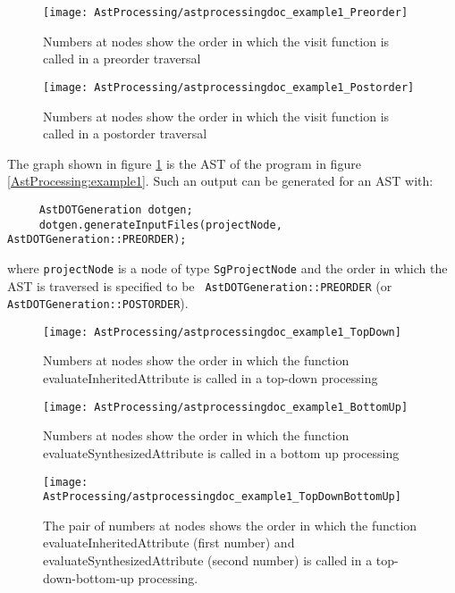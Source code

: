 \begin{figure}
\texttt{[image: AstProcessing/astprocessingdoc\_example1\_Preorder]}
\caption{Numbers at nodes show the order in which the visit function is called in a preorder traversal}
\label{AstProcessing:PreorderAst}
\end{figure}

\begin{figure}
\texttt{[image: AstProcessing/astprocessingdoc\_example1\_Postorder]}
\caption{Numbers at nodes show the order in which the visit function is called in a postorder traversal}
\label{introduction:PostorderAst}
\end{figure}

The graph shown in figure \ref{AstProcessing:PreorderAst} is the AST of
the program in figure \ref{AstProcessing:example1}. Such an output can
be generated for an AST with:

{\indent
{\mySmallFontSize
\begin{verbatim}
     AstDOTGeneration dotgen;
     dotgen.generateInputFiles(projectNode, AstDOTGeneration::PREORDER);
\end{verbatim}
}}
where {\tt projectNode} is a node of type {\tt SgProjectNode} and the
order in which the AST is traversed is specified to be {\tt
AstDOTGeneration::PREORDER} (or {\tt AstDOTGeneration::POSTORDER}).

\begin{figure}
\texttt{[image: AstProcessing/astprocessingdoc\_example1\_TopDown]}
\caption{Numbers at nodes show the order in which the function evaluateInheritedAttribute is called in a top-down processing}
\label{AstProcessing:TopDownAst}
\end{figure}

\begin{figure}
\texttt{[image: AstProcessing/astprocessingdoc\_example1\_BottomUp]}
\caption{Numbers at nodes show the order in which the function evaluateSynthesizedAttribute is called in a bottom up processing}
\label{AstProcessing:BottomUpAst}
\end{figure}

\begin{figure}
\texttt{[image: AstProcessing/astprocessingdoc\_example1\_TopDownBottomUp]}
\caption{The pair of numbers at nodes shows the order in which the function
    evaluateInheritedAttribute (first number) and evaluateSynthesizedAttribute (second number)
    is called in a top-down-bottom-up processing.}
\label{AstProcessing:TopDownBottomUpAst}
\end{figure}


